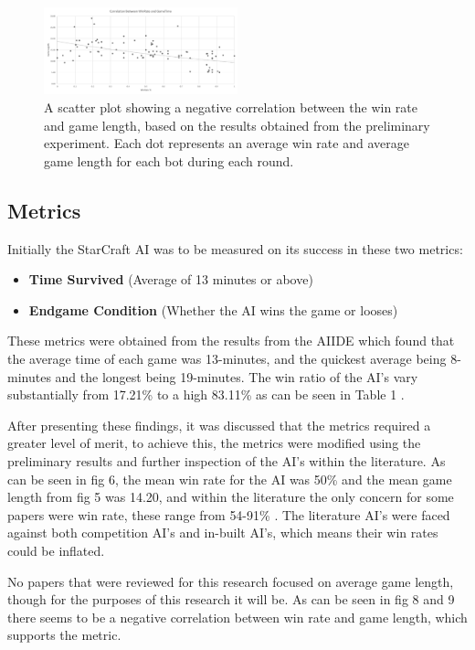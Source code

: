 \documentclass[journal]{IEEEtran}
\begin{document}
\begin{figure}[H]
	\centering
	\includegraphics[width=0.5\textwidth]{Scatter}
	\caption{A scatter plot showing a negative correlation between the win rate and game length, based on the results obtained from the preliminary experiment. Each dot represents an average win rate and average game length for each bot during each round.}
	\label{Fig8}
\end{figure}
\subsection{Metrics}

Initially the StarCraft AI was to be measured on its success in these two metrics:
\begin{itemize}
	\item \textbf{Time Survived} (Average of 13 minutes or above)
	\item \textbf{Endgame Condition} (Whether the AI wins the game or looses)
\end{itemize}
These metrics were obtained from the results from the AIIDE which found that the average time of each game was 13-minutes, and the quickest average being 8-minutes and the longest being 19-minutes. The win ratio of the AI's vary substantially from 17.21\% to a high 83.11\% as can be seen in Table 1 \cite{Results}. 

After presenting these findings, it was discussed that the metrics required a greater level of merit, to achieve this, the metrics were modified using the preliminary results and further inspection of the AI's within the literature. As can be seen in fig 6, the mean win rate for the AI was 50\% and the mean game length from fig 5 was 14.20, and within the literature the only concern for some papers were win rate, these range from 54-91\% \cite{ELGoal,Swen,OnlineEvo,GoalDriven}. The literature AI's were faced against both competition AI's and in-built AI's, which means their win rates could be inflated.

No papers that were reviewed for this research focused on average game length, though for the purposes of this research it will be. As can be seen in fig 8 and 9 there seems to be a negative correlation between win rate and game length, which supports the metric.
\newline
\end{document}

